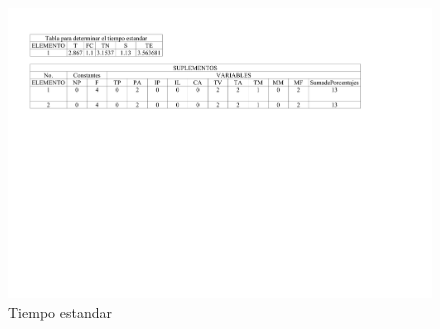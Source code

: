     \begin{figure}[H]
        \centering
        \includegraphics[scale=0.25]{30/img/determinacionHolguras.pdf}
        \caption{Tiempo estandar}
        \label{fig:deterholgura}
    \end{figure}
    
